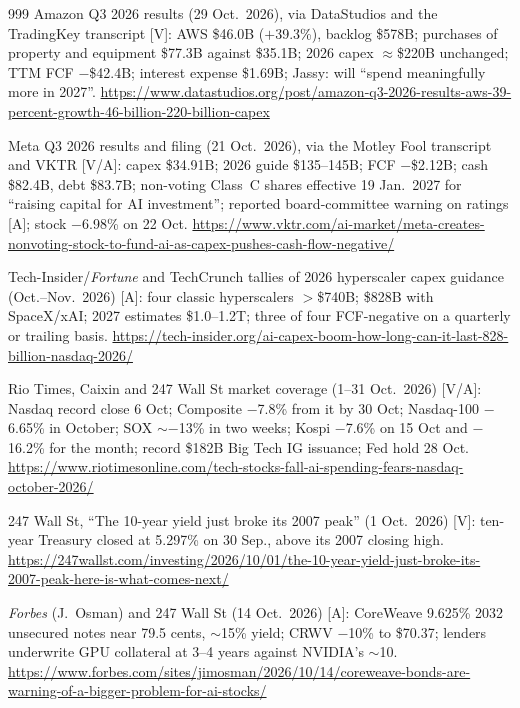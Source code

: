 \begin{thebibliography}{999}
 Amazon Q3 2026 results (29 Oct.\ 2026), via DataStudios and the TradingKey transcript [V]: AWS \$46.0B ($+$39.3\%), backlog \$578B; purchases of property and equipment \$77.3B against \$35.1B; 2026 capex $\approx$\$220B unchanged; TTM FCF $-$\$42.4B; interest expense \$1.69B; Jassy: will ``spend meaningfully more in 2027''. \url{https://www.datastudios.org/post/amazon-q3-2026-results-aws-39-percent-growth-46-billion-220-billion-capex}

 Meta Q3 2026 results and filing (21 Oct.\ 2026), via the Motley Fool transcript and VKTR [V/A]: capex \$34.91B; 2026 guide \$135--145B; FCF $-$\$2.12B; cash \$82.4B, debt \$83.7B; non-voting Class~C shares effective 19 Jan.\ 2027 for ``raising capital for AI investment''; reported board-committee warning on ratings [A]; stock $-$6.98\% on 22 Oct. \url{https://www.vktr.com/ai-market/meta-creates-nonvoting-stock-to-fund-ai-as-capex-pushes-cash-flow-negative/}

 Tech-Insider/\emph{Fortune} and TechCrunch tallies of 2026 hyperscaler capex guidance (Oct.--Nov.\ 2026) [A]: four classic hyperscalers $>$\$740B; \$828B with SpaceX/xAI; 2027 estimates \$1.0--1.2T; three of four FCF-negative on a quarterly or trailing basis. \url{https://tech-insider.org/ai-capex-boom-how-long-can-it-last-828-billion-nasdaq-2026/}

 Rio Times, Caixin and 247 Wall St market coverage (1--31 Oct.\ 2026) [V/A]: Nasdaq record close 6 Oct; Composite $-$7.8\% from it by 30 Oct; Nasdaq-100 $-$6.65\% in October; SOX $\sim$$-$13\% in two weeks; Kospi $-$7.6\% on 15 Oct and $-$16.2\% for the month; record \$182B Big Tech IG issuance; Fed hold 28 Oct. \url{https://www.riotimesonline.com/tech-stocks-fall-ai-spending-fears-nasdaq-october-2026/}

 247 Wall St, ``The 10-year yield just broke its 2007 peak'' (1 Oct.\ 2026) [V]: ten-year Treasury closed at 5.297\% on 30 Sep., above its 2007 closing high. \url{https://247wallst.com/investing/2026/10/01/the-10-year-yield-just-broke-its-2007-peak-here-is-what-comes-next/}

 \emph{Forbes} (J.~Osman) and 247 Wall St (14 Oct.\ 2026) [A]: CoreWeave 9.625\% 2032 unsecured notes near 79.5 cents, $\sim$15\% yield; CRWV $-$10\% to \$70.37; lenders underwrite GPU collateral at 3--4 years against NVIDIA's $\sim$10. \url{https://www.forbes.com/sites/jimosman/2026/10/14/coreweave-bonds-are-warning-of-a-bigger-problem-for-ai-stocks/}


\end{thebibliography}

